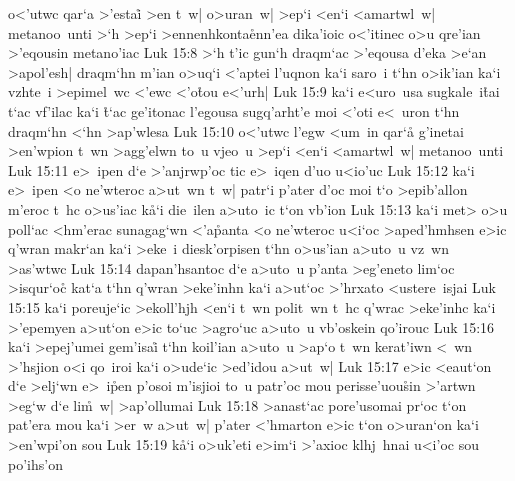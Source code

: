 o<'utwc
qar`a
>'estai\r{}
>en
t~w|
o>uran~w|
>ep`i
<en`i
<amartwl~w|
metanoo~unti
>`h
>ep`i
>ennenhkonta\r{e}nn'ea
dika'ioic
o<'itinec
o>u
qre'ian
>'eqousin
metano'iac\bibvsend
\vs Luk 15:8
>`h
t'ic
gun`h
draqm`ac
>'eqousa
d'eka
>e`an
>apol'esh|
draqm`hn
m'ian
o>uq`i
<'aptei
l'uqnon
ka`i
saro~i
t`hn
o>ik'ian
ka`i
vzhte~i
>epimel~wc
<'ewc
<'o\r{t}ou
e<'urh|\bibvsend
\vs Luk 15:9
ka`i
e<uro~usa
sugkale~i\r{t}ai
t`ac
vf'ilac
ka`i
\r{t}`ac
ge'itonac
l'egousa
sugq'arht'e
moi
<'oti
e<~uron
t`hn
draqm`hn
<`hn
>ap'wlesa\bibvsend
\vs Luk 15:10
o<'utwc
l'egw
<um~in
qar`a\r{}
g'inetai
>en'wpion
t~wn
>agg'elwn
to~u
vjeo~u
>ep`i
<en`i
<amartwl~w|
metanoo~unti\bibvsend
\vs Luk 15:11
e>~ipen
d`e
>'anjrwp'oc
tic
e>~iqen
d'uo
u<io'uc\bibvsend
\vs Luk 15:12
ka`i
e>~ipen
<o
ne'wteroc
a>ut~wn
t~w|
patr`i
p'ater
d'oc
moi
t`o
>epib'allon
m'eroc
t~hc
o>us'iac
k\r{a}`i
die~ilen
a>uto~ic
t`on
vb'ion\bibvsend
\vs Luk 15:13
ka`i
met>
o>u
poll`ac
<hm'erac
sunagag`wn
<'a\r{p}anta
<o
ne'wteroc
u<i`oc
>aped'hmhsen
e>ic
q'wran
makr`an
ka`i
>eke~i
diesk'orpisen
t`hn
o>us'ian
a>uto~u
vz~wn
>as'wtwc\bibvsend
\vs Luk 15:14
dapan'hsantoc
d`e
a>uto~u
p'anta
>eg'eneto
lim`oc
>isqur`o\r{c}
kat`a
t`hn
q'wran
>eke'inhn
ka`i
a>ut`oc
>'hrxato
<ustere~isjai\bibvsend
\vs Luk 15:15
ka`i
poreuje`ic
>ekoll'hjh
<en`i
t~wn
polit~wn
t~hc
q'wrac
>eke'inhc
ka`i
>'epemyen
a>ut`on
e>ic
to`uc
>agro`uc
a>uto~u
vb'oskein
qo'irouc\bibvsend
\vs Luk 15:16
ka`i
>epej'umei
gem'isai\r{}
t`hn
koil'ian
a>uto~u
>ap`o
t~wn
kerat'iwn
<~wn
>'hsjion
o<i
qo~iroi
ka`i
o>ude`ic
>ed'idou
a>ut~w|\bibvsend
\vs Luk 15:17
e>ic
<eaut`on
d`e
>elj`wn
e>~i\r{p}en
p'osoi
m'isjioi
to~u
patr'oc
mou
perisse'uou\r{s}in
>'artwn
>eg`w
d`e
li\r{m}~w|
>ap'ollumai\bibvsend
\vs Luk 15:18
>anast`ac
pore'usomai
pr`oc
t`on
pat'era
mou
ka`i
>er~w
a>ut~w|
p'ater
<'hmarton
e>ic
t`on
o>uran`on
ka`i
>en'wpi'on
sou\bibvsend
\vs Luk 15:19
k\r{a}`i
o>uk'eti
e>im`i
>'axioc
klhj~hnai
u<i'oc
sou
po'ihs'on
